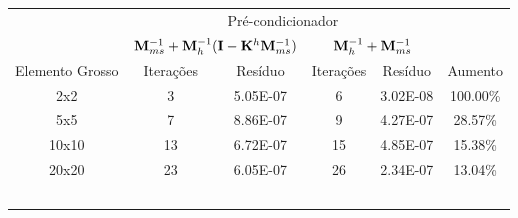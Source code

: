 \begin{table}[]
\begin{tabular}{cclclc}
\cline{2-5}
\multicolumn{1}{c|}{}                 & \multicolumn{4}{c|}{Pré-condicionador}                                                                                          &                               \\ \cline{2-5}
\multicolumn{1}{c|}{}                 & \multicolumn{2}{c|}{$\mathbf{M}^{-1}_{ms} +\mathbf{M}^{-1}_{h}(\mathbf{I}- \mathbf{K}^h \mathbf{M}^{-1}_{ms})$}                             & \multicolumn{2}{c|}{$\mathbf{M}^{-1}_{h} + \mathbf{M}^{-1}_{ms}$}                              &                               \\ \hline
\multicolumn{1}{|c|}{Elemento Grosso} & \multicolumn{1}{c|}{Iterações} & \multicolumn{1}{c|}{Resíduo}  & \multicolumn{1}{c|}{Iterações} & \multicolumn{1}{c|}{Resíduo}  & \multicolumn{1}{c|}{Aumento}  \\ \hline
\multicolumn{1}{|c|}{2x2}             & \multicolumn{1}{c|}{3}         & \multicolumn{1}{c|}{5.05E-07} & \multicolumn{1}{c|}{6}         & \multicolumn{1}{c|}{3.02E-08} & \multicolumn{1}{c|}{100.00\%} \\ \hline
\multicolumn{1}{|c|}{5x5}             & \multicolumn{1}{c|}{7}         & \multicolumn{1}{c|}{8.86E-07} & \multicolumn{1}{c|}{9}         & \multicolumn{1}{c|}{4.27E-07} & \multicolumn{1}{c|}{28.57\%}  \\ \hline
\multicolumn{1}{|c|}{10x10}           & \multicolumn{1}{c|}{13}        & \multicolumn{1}{c|}{6.72E-07} & \multicolumn{1}{c|}{15}        & \multicolumn{1}{c|}{4.85E-07} & \multicolumn{1}{c|}{15.38\%}  \\ \hline
\multicolumn{1}{|c|}{20x20}           & \multicolumn{1}{c|}{23}        & \multicolumn{1}{c|}{6.05E-07} & \multicolumn{1}{c|}{26}        & \multicolumn{1}{c|}{2.34E-07} & \multicolumn{1}{c|}{13.04\%}  \\ \hline
\multicolumn{1}{l}{}                  & \multicolumn{1}{l}{}           &                               & \multicolumn{1}{l}{}           &                               & \multicolumn{1}{l}{}          \\
\multicolumn{1}{l}{}                  & \multicolumn{1}{l}{}           &                               & \multicolumn{1}{l}{}           &                               & \multicolumn{1}{l}{}          \\
\multicolumn{1}{l}{}                  & \multicolumn{1}{l}{}           &                               & \multicolumn{1}{l}{}           &                               & \multicolumn{1}{l}{}          \\
\multicolumn{1}{l}{}                  & \multicolumn{1}{l}{}           &                               & \multicolumn{1}{l}{}           &                               & \multicolumn{1}{l}{}          \\
\multicolumn{1}{l}{}                  & \multicolumn{1}{l}{}           &                               & \multicolumn{1}{l}{}           &                               & \multicolumn{1}{l}{}         
\end{tabular}
\end{table}


